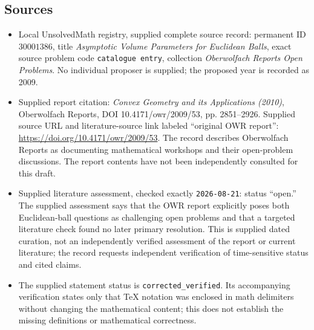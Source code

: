 \documentclass[11pt]{article}
\begin{document}
\subsection{Sources}
\begin{itemize}
\item Local UnsolvedMath registry, supplied complete source record: permanent ID \(30001386\), title \emph{Asymptotic Volume Parameters for Euclidean Balls}, exact source problem code \texttt{catalogue entry}, collection \emph{Oberwolfach Reports Open Problems}. No individual proposer is supplied; the proposed year is recorded as 2009.
\item Supplied report citation: \emph{Convex Geometry and its Applications (2010)}, Oberwolfach Reports, DOI 10.4171/owr/2009/53, pp. 2851--2926. Supplied source URL and literature-source link labeled ``original OWR report'': \url{https://doi.org/10.4171/owr/2009/53}. The record describes Oberwolfach Reports as documenting mathematical workshops and their open-problem discussions. The report contents have not been independently consulted for this draft.
\item Supplied literature assessment, checked exactly \texttt{2026-08-21}: status ``open.'' The supplied assessment says that the OWR report explicitly poses both Euclidean-ball questions as challenging open problems and that a targeted literature check found no later primary resolution. This is supplied dated curation, not an independently verified assessment of the report or current literature; the record requests independent verification of time-sensitive status and cited claims.
\item The supplied statement status is \texttt{corrected\_verified}. Its accompanying verification states only that TeX notation was enclosed in math delimiters without changing the mathematical content; this does not establish the missing definitions or mathematical correctness.
\end{itemize}
\end{document}
